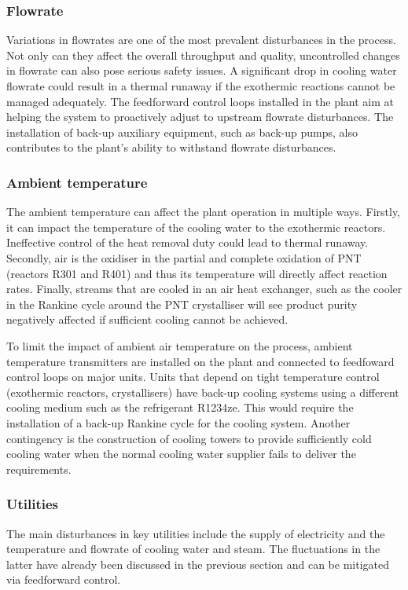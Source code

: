 \subsubsection{Flowrate}
Variations in flowrates are one of the most prevalent disturbances in the process. Not only can they affect the overall throughput and quality, uncontrolled changes in flowrate can also pose serious safety issues. A significant drop in cooling water flowrate could result in a thermal runaway if the exothermic reactions cannot be managed adequately. The feedforward control loops installed in the plant aim at helping the system to proactively adjust to upstream flowrate disturbances. The installation of back-up auxiliary equipment, such as back-up pumps, also contributes to the plant's ability to withstand flowrate disturbances.

\subsubsection{Ambient temperature}
The ambient temperature can affect the plant operation in multiple ways. Firstly, it can impact the temperature of the cooling water to the exothermic reactors. Ineffective control of the heat removal duty could lead to thermal runaway. Secondly, air is the oxidiser in the partial and complete oxidation of PNT (reactors R301 and R401) and thus its temperature will directly affect reaction rates. Finally, streams that are cooled in an air heat exchanger, such as the cooler in the Rankine cycle around the PNT crystalliser will see product purity negatively affected if sufficient cooling cannot be achieved. 

To limit the impact of ambient air temperature on the process, ambient temperature transmitters are installed on the plant and connected to feedfoward control loops on major units. Units that depend on tight temperature control (exothermic reactors, crystallisers) have back-up cooling systems using a different cooling medium such as the refrigerant R1234ze. This would require the installation of a back-up Rankine cycle for the cooling system. Another contingency is the construction of cooling towers to provide sufficiently cold cooling water when the normal cooling water supplier fails to deliver the requirements.

\subsubsection{Utilities}
The main disturbances in key utilities include the supply of electricity and the temperature and flowrate of cooling water and steam. The fluctuations in the latter have already been discussed in the previous section and can be mitigated via feedforward control.

